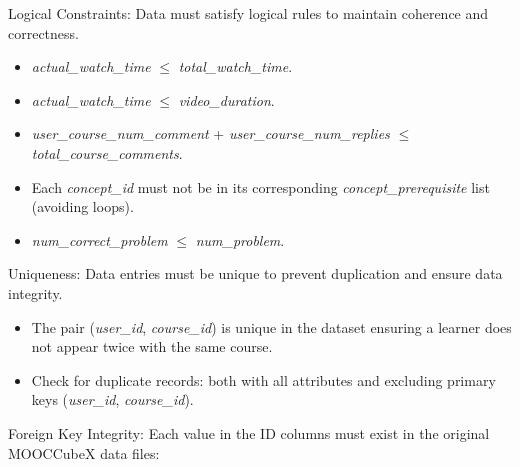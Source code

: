 \documentclass{ieeeaccess}
\begin{document}
Logical Constraints: Data must satisfy logical rules to maintain coherence and correctness.
\begin{itemize}
    \item \textit{actual\_watch\_time} $\le$ \textit{total\_watch\_time}.
    \item \textit{actual\_watch\_time} $\le$ \textit{video\_duration}.
    \item \textit{user\_course\_num\_comment} + \textit{user\_course\_num\_replies} $\le$ \textit{total\_course\_comments}.
    \item Each \textit{concept\_id} must not be in its corresponding \textit{concept\_prerequisite} list (avoiding loops).
    \item \textit{num\_correct\_problem} $\le$ \textit{num\_problem}.
\end{itemize}

Uniqueness: Data entries must be unique to prevent duplication and ensure data integrity.
\begin{itemize}
    \item The pair (\textit{user\_id}, \textit{course\_id}) is unique in the dataset ensuring a learner does not appear twice with the same course.
    \item Check for duplicate records: both with all attributes and excluding primary keys (\textit{user\_id}, \textit{course\_id}).
\end{itemize}

Foreign Key Integrity: Each value in the ID columns must exist in the original MOOCCubeX data files:

\begin{table}[H]
\centering
\caption{Foreign key validation with MOOCCubeX entity files}
\end{table}
\end{document}
